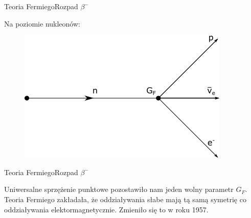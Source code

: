 \documentclass[xcolor={dvipsnames}]{beamer}
\begin{document}
\begin{frame}{Teoria Fermiego}{Rozpad $\beta^-$}

    Na poziomie nukleonów:

    \begin{figure}

        \includegraphics[scale=0.9]{4pointsnuc.png}

    \end{figure}

\end{frame}

\begin{frame}{Teoria Fermiego}{Rozpad $\beta^-$}

Uniwersalne sprzężenie punktowe pozostawiło nam jeden wolny parametr $G_F$. Teoria Fermiego zakładała, że oddziaływania słabe mają tą samą symetrię co oddziaływania elektormagnetycznie. Zmieniło się to w roku 1957.

\end{frame}
\end{document}
